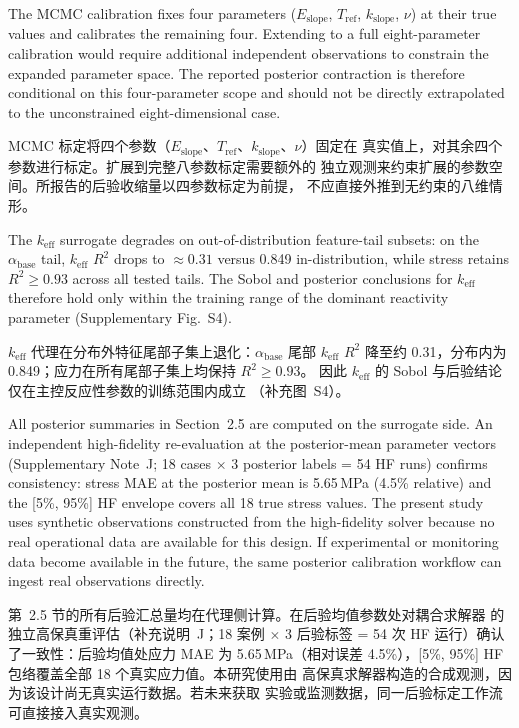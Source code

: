 \documentclass[11pt,a4paper]{article}
\newcommand{\keff}{\ensuremath{k_{\mathrm{eff}}}}
\newcommand{\Eslope}{\ensuremath{E_{\mathrm{slope}}}}
\newcommand{\abase}{\ensuremath{\alpha_{\mathrm{base}}}}
\newcommand{\Tref}{\ensuremath{T_{\mathrm{ref}}}}
\newcommand{\kslope}{\ensuremath{k_{\mathrm{slope}}}}
\begin{document}
The MCMC calibration fixes four parameters (\Eslope{}, \Tref{},
\kslope{}, $\nu$) at their true values and calibrates the remaining
four. Extending to a full eight-parameter calibration would require
additional independent observations to constrain the expanded parameter
space. The reported posterior contraction is therefore conditional on
this four-parameter scope and should not be directly extrapolated to the
unconstrained eight-dimensional case.

MCMC 标定将四个参数（\Eslope{}、\Tref{}、\kslope{}、$\nu$）固定在
真实值上，对其余四个参数进行标定。扩展到完整八参数标定需要额外的
独立观测来约束扩展的参数空间。所报告的后验收缩量以四参数标定为前提，
不应直接外推到无约束的八维情形。

The \keff{} surrogate degrades on out-of-distribution feature-tail
subsets: on the \abase{} tail, \keff{} $R^2$ drops to ${\approx}0.31$
versus 0.849 in-distribution, while stress retains $R^2 \geq 0.93$
across all tested tails. The Sobol and posterior conclusions for \keff{}
therefore hold only within the training range of the dominant reactivity
parameter (Supplementary Fig.~S4).

\keff{} 代理在分布外特征尾部子集上退化：\abase{} 尾部 \keff{} $R^2$
降至约 0.31，分布内为 0.849；应力在所有尾部子集上均保持 $R^2 \geq 0.93$。
因此 \keff{} 的 Sobol 与后验结论仅在主控反应性参数的训练范围内成立
（补充图~S4）。

All posterior summaries in Section~2.5 are computed on the surrogate
side. An independent high-fidelity re-evaluation at the posterior-mean
parameter vectors (Supplementary Note~J; 18 cases $\times$ 3 posterior
labels = 54 HF runs) confirms consistency: stress MAE at the posterior
mean is 5.65\,MPa (4.5\% relative) and the [5\%, 95\%] HF envelope
covers all 18 true stress values. The present study uses synthetic
observations constructed from the high-fidelity solver because no real
operational data are available for this design. If experimental or
monitoring data become available in the future, the same posterior
calibration workflow can ingest real observations directly.

第~2.5 节的所有后验汇总量均在代理侧计算。在后验均值参数处对耦合求解器
的独立高保真重评估（补充说明~J；18 案例 $\times$ 3 后验标签 = 54 次
HF 运行）确认了一致性：后验均值处应力 MAE 为 5.65\,MPa（相对误差
4.5\%），[5\%, 95\%] HF 包络覆盖全部 18 个真实应力值。本研究使用由
高保真求解器构造的合成观测，因为该设计尚无真实运行数据。若未来获取
实验或监测数据，同一后验标定工作流可直接接入真实观测。
\end{document}
